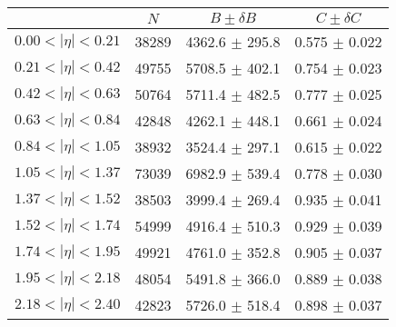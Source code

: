 \begin{tabular}{lccc}
\hline
    &   $N$   & $B \pm \delta B$  &  $C \pm \delta C$ \\
\hline
$0.00 < |\eta| <0.21$          & 38289      & 4362.6     $\pm$ 295.8 & 0.575      $\pm$ 0.022 \\
$0.21 < |\eta| <0.42$          & 49755      & 5708.5     $\pm$ 402.1 & 0.754      $\pm$ 0.023 \\
$0.42 < |\eta| <0.63$          & 50764      & 5711.4     $\pm$ 482.5 & 0.777      $\pm$ 0.025 \\
$0.63 < |\eta| <0.84$          & 42848      & 4262.1     $\pm$ 448.1 & 0.661      $\pm$ 0.024 \\
$0.84 < |\eta| <1.05$          & 38932      & 3524.4     $\pm$ 297.1 & 0.615      $\pm$ 0.022 \\
$1.05 < |\eta| <1.37$          & 73039      & 6982.9     $\pm$ 539.4 & 0.778      $\pm$ 0.030 \\
$1.37 < |\eta| <1.52$          & 38503      & 3999.4     $\pm$ 269.4 & 0.935      $\pm$ 0.041 \\
$1.52 < |\eta| <1.74$          & 54999      & 4916.4     $\pm$ 510.3 & 0.929      $\pm$ 0.039 \\
$1.74 < |\eta| <1.95$          & 49921      & 4761.0     $\pm$ 352.8 & 0.905      $\pm$ 0.037 \\
$1.95 < |\eta| <2.18$          & 48054      & 5491.8     $\pm$ 366.0 & 0.889      $\pm$ 0.038 \\
$2.18 < |\eta| <2.40$          & 42823      & 5726.0     $\pm$ 518.4 & 0.898      $\pm$ 0.037 \\
\hline
\end{tabular}
